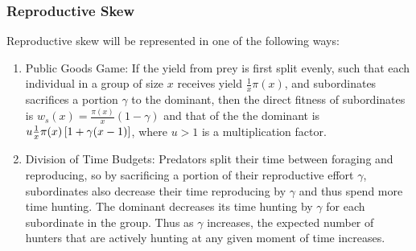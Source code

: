 \subsubsection{Reproductive Skew}
Reproductive skew will be represented in one of the following ways:
\begin{enumerate}
\item Public Goods Game: If the yield from prey is first split evenly, such that each individual in a group of size $x$ receives yield $\frac{1}{x} \pi(x)$, and subordinates sacrifices a portion $\gamma$ to the dominant, then the direct fitness of subordinates is $w_s(x) = \frac{\pi(x)}{x}(1-\gamma)$ and that of the the dominant is $u\frac{1}{x} \pi(x) \left[ 1 + \gamma(x-1) \right]$, where $u>1$ is a multiplication factor.
\item Division of Time Budgets: Predators split their time between foraging and reproducing, so by sacrificing a portion of their reproductive effort $\gamma$, subordinates also decrease their time reproducing by $\gamma$ and thus spend more time hunting. The dominant decreases its time hunting by $\gamma$ for each subordinate in the group. Thus as $\gamma$ increases, the expected number of hunters that are actively hunting at any given moment of time increases.
\end{enumerate}


